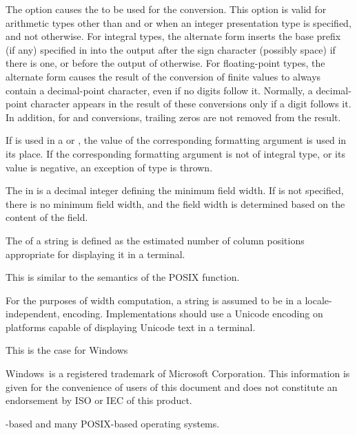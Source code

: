 \pnum
The \tcode{\#} option causes the
to be used for the conversion.
This option is valid for arithmetic types other than
 and 
or when an integer presentation type is specified, and not otherwise.
For integral types,
the alternate form inserts the
base prefix (if any) specified in 
into the output after the sign character (possibly space) if there is one, or
before the output of  otherwise.
For floating-point types,
the alternate form causes the result of the conversion of finite values
to always contain a decimal-point character,
even if no digits follow it.
Normally, a decimal-point character appears in the result of these
conversions only if a digit follows it.
In addition, for  and  conversions,
trailing zeros are not removed from the result.

\pnum
If  is used in
a  or ,
the value of the corresponding formatting argument is used in its place.
If the corresponding formatting argument is not of integral type, or
its value is negative,
an exception of type  is thrown.

\pnum
The  in
 is a decimal integer defining the minimum field width.
If  is not specified,
there is no minimum field width, and
the field width is determined based on the content of the field.

\pnum
{}%
The  of a string is defined as
the estimated number of column positions appropriate
for displaying it in a terminal.
\begin{note}
This is similar to the semantics of the POSIX  function.
\end{note}

\pnum
For the purposes of width computation,
a string is assumed to be in
a locale-independent,
 encoding.
Implementations should use a Unicode encoding
on platforms capable of displaying Unicode text in a terminal.
\begin{note}
This is the case for Windows
\begin{footnote}
Windows\textregistered\ is a registered trademark of Microsoft Corporation.
This information is given for the convenience of users of this document and
does not constitute an endorsement by ISO or IEC of this product.
\end{footnote}%
-based and
many POSIX-based operating systems.
\end{note}

